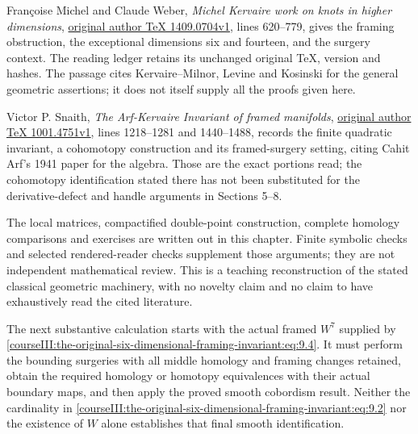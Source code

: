 Françoise Michel and Claude Weber, \emph{Michel Kervaire work on knots in higher dimensions}, \href{https://arxiv.org/abs/1409.0704v1}{original author TeX 1409.0704v1}, lines 620--779, gives the framing obstruction, the exceptional dimensions six and fourteen, and the surgery context. The reading ledger retains its unchanged original TeX, version and hashes. The passage cites Kervaire--Milnor, Levine and Kosinski for the general geometric assertions; it does not itself supply all the proofs given here.

Victor P. Snaith, \emph{The Arf-Kervaire Invariant of framed manifolds}, \href{https://arxiv.org/abs/1001.4751v1}{original author TeX 1001.4751v1}, lines 1218--1281 and 1440--1488, records the finite quadratic invariant, a cohomotopy construction and its framed-surgery setting, citing Cahit Arf's 1941 paper for the algebra. Those are the exact portions read; the cohomotopy identification stated there has not been substituted for the derivative-defect and handle arguments in Sections 5--8.

The local matrices, compactified double-point construction, complete homology comparisons and exercises are written out in this chapter. Finite symbolic checks and selected rendered-reader checks supplement those arguments; they are not independent mathematical review. This is a teaching reconstruction of the stated classical geometric machinery, with no novelty claim and no claim to have exhaustively read the cited literature.

The next substantive calculation starts with the actual framed \(W^7\) supplied by \eqref{courseIII:the-original-six-dimensional-framing-invariant:eq:9.4}. It must perform the bounding surgeries with all middle homology and framing changes retained, obtain the required homology or homotopy equivalences with their actual boundary maps, and then apply the proved smooth cobordism result. Neither the cardinality in \eqref{courseIII:the-original-six-dimensional-framing-invariant:eq:9.2} nor the existence of \(W\) alone establishes that final smooth identification.

